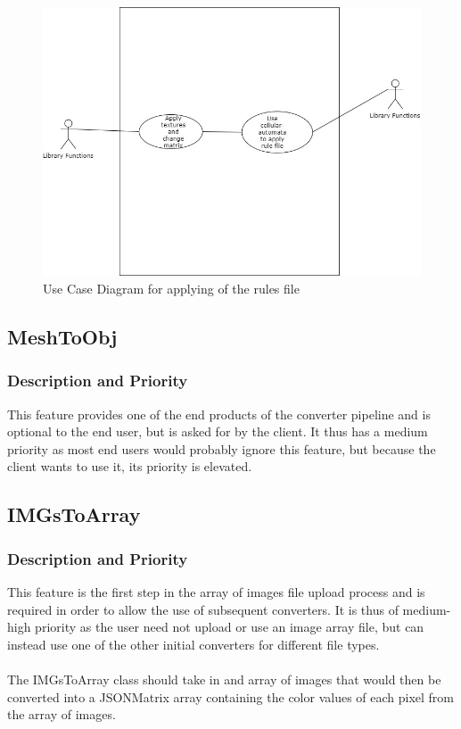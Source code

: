 \documentclass[english]{article}
\begin{document}
		\begin{figure}[h]
			\includegraphics[width=\textwidth]{Use Cases/ApplyRuleFile.jpg}
			\caption{Use Case Diagram for applying of the rules file }
		\end{figure}
		
	\pagebreak
	\subsection{MeshToObj}
	\subsubsection{Description and Priority}
	This feature provides one of the end products of the converter pipeline and is optional to the end user, but is asked for by the client. It thus has a medium priority as most end users would probably ignore this feature, but because the client wants to use it, its priority is elevated.
	
	\pagebreak
	\subsection{IMGsToArray}
	\subsubsection{Description and Priority}
	This feature is the first step in the array of images file upload process and is required in order to allow the use of subsequent converters. It is thus of medium-high priority as the user need not upload or use an image array file, but can instead use one of the other initial converters for different file types.\\\\
	The IMGsToArray class should take in and array of images that would then be converted into a JSONMatrix array containing the color values of each pixel from the array of images.
	
\end{document}
